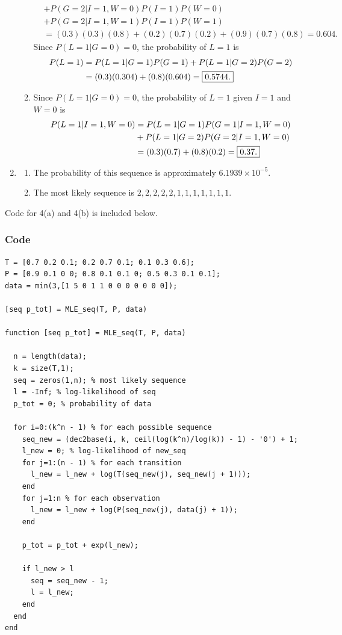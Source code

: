 \documentclass[11pt]{article}
\begin{document}
\begin{enumerate}
\begin{enumerate}
\begin{align*}
 &  + P(G = 2 | I = 1, W = 0)P(I = 1)P(W = 0)   \\
 &  + P(G = 2 | I = 1, W = 1)P(I = 1)P(W = 1)   \\
 &  = (0.3)(0.3)(0.8)
    + (0.2)(0.7)(0.2)
    + (0.9)(0.7)(0.8)
    = 0.604.
\end{align*}
Since $P(L = 1 | G = 0) = 0$, the probability of $L = 1$ is
\begin{align*}
P(L = 1)
 &  = P(L = 1 | G = 1) P(G = 1) + P(L = 1 | G = 2) P(G = 2) \\
 &  = (0.3)(0.304) + (0.8)(0.604)
    = \mbox{\fbox{$0.5744$.}}
\end{align*}
\item Since $P(L = 1 | G = 0) = 0$, the probability of $L = 1$ given $I = 1$
and $W = 0$ is
\begin{align*}
P(L = 1 | I = 1, W = 0)
 &  = P(L = 1 | G = 1) P(G = 1 | I = 1, W = 0)  \\
 &  + P(L = 1 | G = 2) P(G = 2 | I = 1, W = 0)  \\
 &  = (0.3)(0.7) + (0.8)(0.2)
    = \mbox{\fbox{$0.37$.}}
\end{align*}
\end{enumerate}
\item
\begin{enumerate}
\item The probability of this sequence is approximately
$6.1939 \times 10^{-5}$.
\item The most likely sequence is $2,2,2,2,2,1,1,1,1,1,1,1$.
\end{enumerate}
\end{enumerate}
Code for 4(a) and 4(b) is included below.
\subsubsection*{Code}
\begin{verbatim}
T = [0.7 0.2 0.1; 0.2 0.7 0.1; 0.1 0.3 0.6];
P = [0.9 0.1 0 0; 0.8 0.1 0.1 0; 0.5 0.3 0.1 0.1];
data = min(3,[1 5 0 1 1 0 0 0 0 0 0 0]);

[seq p_tot] = MLE_seq(T, P, data)

function [seq p_tot] = MLE_seq(T, P, data)

  n = length(data);
  k = size(T,1);
  seq = zeros(1,n); % most likely sequence
  l = -Inf; % log-likelihood of seq
  p_tot = 0; % probability of data

  for i=0:(k^n - 1) % for each possible sequence
    seq_new = (dec2base(i, k, ceil(log(k^n)/log(k)) - 1) - '0') + 1;
    l_new = 0; % log-likelihood of new_seq
    for j=1:(n - 1) % for each transition
      l_new = l_new + log(T(seq_new(j), seq_new(j + 1)));
    end
    for j=1:n % for each observation
      l_new = l_new + log(P(seq_new(j), data(j) + 1));
    end

    p_tot = p_tot + exp(l_new);

    if l_new > l
      seq = seq_new - 1;
      l = l_new;
    end
  end
end
\end{verbatim}
\end{document}
